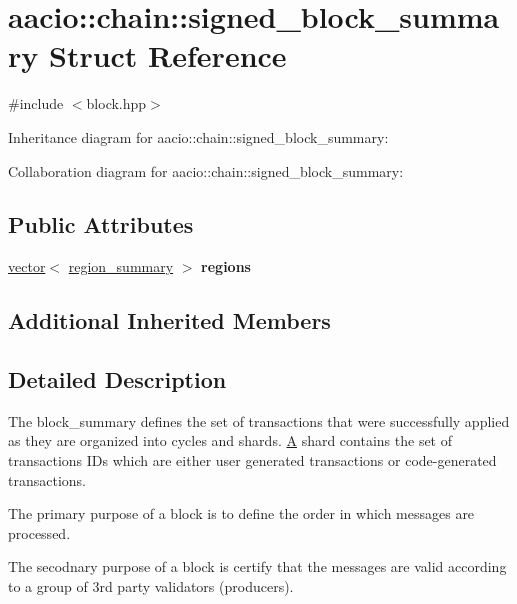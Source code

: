 \hypertarget{structaacio_1_1chain_1_1signed__block__summary}{}\section{aacio\+:\+:chain\+:\+:signed\+\_\+block\+\_\+summary Struct Reference}
\label{structaacio_1_1chain_1_1signed__block__summary}


{\ttfamily \#include $<$block.\+hpp$>$}



Inheritance diagram for aacio\+:\+:chain\+:\+:signed\+\_\+block\+\_\+summary\+:


Collaboration diagram for aacio\+:\+:chain\+:\+:signed\+\_\+block\+\_\+summary\+:
\subsection*{Public Attributes}
\begin{DoxyCompactItemize}
\item 
\mbox{\label{structaacio_1_1chain_1_1signed__block__summary_aa488a74c626a1553e735cf7519e6c330}} 
\mbox{\hyperlink{classstd_1_1vector}{vector}}$<$ \mbox{\hyperlink{structaacio_1_1chain_1_1region__summary}{region\+\_\+summary}} $>$ {\bfseries regions}
\end{DoxyCompactItemize}
\subsection*{Additional Inherited Members}


\subsection{Detailed Description}
The block\+\_\+summary defines the set of transactions that were successfully applied as they are organized into cycles and shards. \mbox{\hyperlink{struct_a}{A}} shard contains the set of transactions I\+Ds which are either user generated transactions or code-\/generated transactions.

The primary purpose of a block is to define the order in which messages are processed.

The secodnary purpose of a block is certify that the messages are valid according to a group of 3rd party validators (producers).

